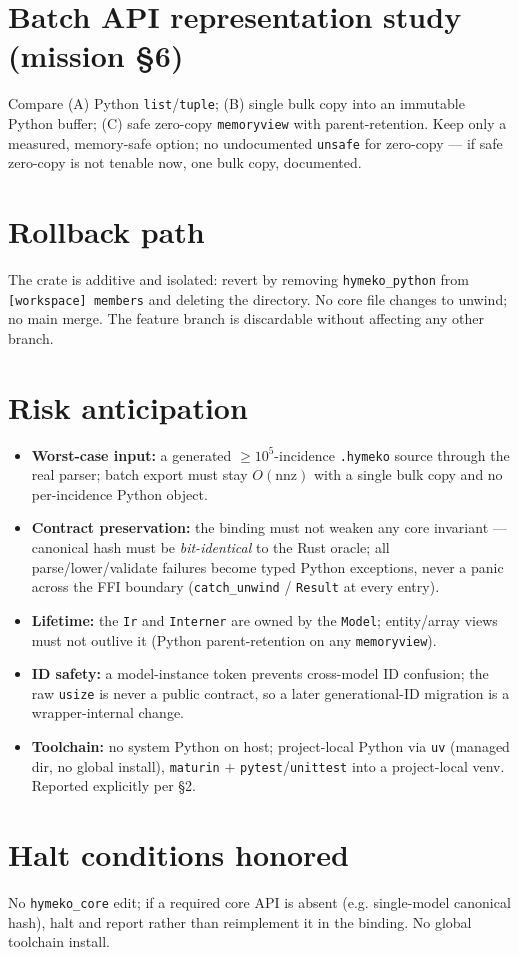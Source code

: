 \documentclass[11pt]{article}
\begin{document}
\section{Batch API representation study (mission \S6)}
Compare (A) Python \texttt{list}/\texttt{tuple}; (B) single bulk copy into an immutable Python
buffer; (C) safe zero-copy \texttt{memoryview} with parent-retention. Keep only a measured,
memory-safe option; no undocumented \texttt{unsafe} for zero-copy --- if safe zero-copy is not
tenable now, one bulk copy, documented.

\section{Rollback path}
The crate is additive and isolated: revert by removing \texttt{hymeko\_python} from
\texttt{[workspace] members} and deleting the directory. No core file changes to unwind; no
main merge. The feature branch is discardable without affecting any other branch.

\section{Risk anticipation}
\begin{itemize}[nosep]
  \item \textbf{Worst-case input:} a generated $\ge 10^5$-incidence \texttt{.hymeko} source
        through the real parser; batch export must stay $O(\text{nnz})$ with a single bulk copy
        and no per-incidence Python object.
  \item \textbf{Contract preservation:} the binding must not weaken any core invariant ---
        canonical hash must be \emph{bit-identical} to the Rust oracle; all parse/lower/validate
        failures become typed Python exceptions, never a panic across the FFI boundary
        (\texttt{catch\_unwind} / \texttt{Result} at every entry).
  \item \textbf{Lifetime:} the \texttt{Ir} and \texttt{Interner} are owned by the \texttt{Model};
        entity/array views must not outlive it (Python parent-retention on any \texttt{memoryview}).
  \item \textbf{ID safety:} a model-instance token prevents cross-model ID confusion; the raw
        \texttt{usize} is never a public contract, so a later generational-ID migration is a
        wrapper-internal change.
  \item \textbf{Toolchain:} no system Python on host; project-local Python via \texttt{uv}
        (managed dir, no global install), \texttt{maturin} $+$ \texttt{pytest}/\texttt{unittest}
        into a project-local venv. Reported explicitly per \S2.
\end{itemize}

\section{Halt conditions honored}
No \texttt{hymeko\_core} edit; if a required core API is absent (e.g. single-model canonical
hash), halt and report rather than reimplement it in the binding. No global toolchain install.
\end{document}
